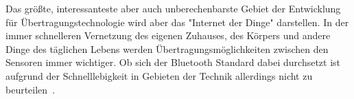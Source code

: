 \begin{multicols}{3}
Das größte, interessanteste aber auch unberechenbarste Gebiet der Entwicklung für Übertragungstechnologie wird aber das "Internet der Dinge" darstellen. In der immer schnelleren Vernetzung des eigenen Zuhauses, des Körpers und andere Dinge des täglichen Lebens werden Übertragungsmöglichkeiten zwischen den Sensoren immer wichtiger. Ob sich der Bluetooth Standard dabei durchsetzt ist aufgrund der Schnelllebigkeit in Gebieten der Technik allerdings nicht zu beurteilen~\cite{BLE.1}.

\printbibliography[segment=5,heading=subbibliography]
\end{multicols}

\newpage